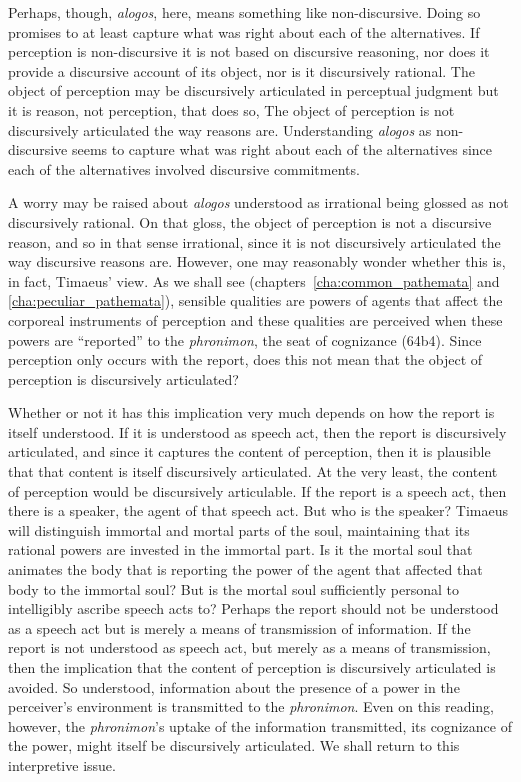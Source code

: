 Perhaps, though, \emph{alogos}, here, means something like non-discursive. Doing so pro\-mises to at least capture what was right about each of the alternatives. If perception is non-discursive it is not based on discursive reasoning, nor does it provide a discursive account of its object, nor is it discursively rational. The object of perception may be discursively articulated in perceptual judgment but it is reason, not perception, that does so, The object of perception is not discursively articulated the way reasons are. Understanding \emph{alogos} as non-discursive seems to capture what was right about each of the alternatives since each of the alternatives involved discursive commitments.

A worry may be raised about \emph{alogos} understood as irrational being glossed as not discursively rational. On that gloss, the object of perception is not a discursive reason, and so in that sense irrational, since it is not discursively articulated the way discursive reasons are. However, one may reasonably wonder whether this is, in fact, Timaeus' view. As we shall see (chapters~\ref{cha:common_pathemata} and \ref{cha:peculiar_pathemata}), sensible qualities are powers of agents that affect the corporeal instruments of perception and these qualities are perceived when these powers are ``reported'' to the \emph{phronimon}, the seat of cognizance (64b4). Since perception only occurs with the report, does this not mean that the object of perception is discursively articulated?

Whether or not it has this implication very much depends on how the report is itself understood. If it is understood as speech act, then the report is discursively articulated, and since it captures the content of perception, then it is plausible that that content is itself discursively articulated. At the very least, the content of perception would be discursively articulable. If the report is a speech act, then there is a speaker, the agent of that speech act. But who is the speaker? Timaeus will distinguish immortal and mortal parts of the soul, maintaining that its rational powers are invested in the immortal part. Is it the mortal soul that animates the body that is reporting the power of the agent that affected that body to the immortal soul? But is the mortal soul sufficiently personal to intelligibly ascribe speech acts to? Perhaps the report should not be understood as a speech act but is merely a means of transmission of information. If the report is not understood as speech act, but merely as a means of transmission, then the implication that the content of perception is discursively articulated is avoided. So understood, information about the presence of a power in the perceiver's environment is transmitted to the \emph{phronimon}. Even on this reading, however, the \emph{phronimon}'s uptake of the information transmitted, its cognizance of the power, might itself be discursively articulated. We shall return to this interpretive issue.

